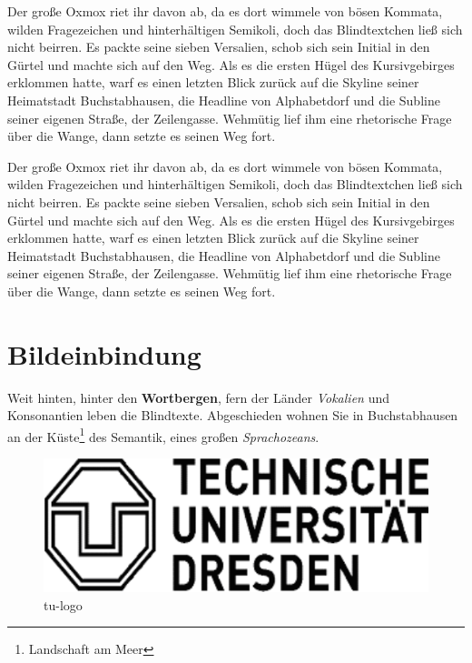 \documentclass[%
	12pt,%
	a4paper,%
	oneside,%
 liststotoc, idxtotoc, bibtotoc, %
	halfparskip,%
	nochapterprefix,%
	appendixprefix, %
smallheadings,%
]{scrreprt}
\newcommand{\alt}[1]{}%
\begin{document}
Der große Oxmox riet ihr davon ab, da es dort wimmele von bösen Kommata, wilden Fragezeichen und hinterhältigen Semikoli, doch das Blindtextchen ließ sich nicht beirren. Es packte seine sieben Versalien, schob sich sein Initial in den Gürtel und machte sich auf den Weg. Als es die ersten Hügel des Kursivgebirges erklommen hatte, warf es einen letzten Blick zurück auf die Skyline seiner Heimatstadt Buchstabhausen, die Headline von Alphabetdorf und die Subline seiner eigenen Straße, der Zeilengasse. Wehmütig lief ihm eine rhetorische Frage über die Wange, dann setzte es seinen Weg fort.

Der große Oxmox riet ihr davon ab, da es dort wimmele von bösen Kommata, wilden Fragezeichen und hinterhältigen Semikoli, doch das Blindtextchen ließ sich nicht beirren. Es packte seine sieben Versalien, schob sich sein Initial in den Gürtel und machte sich auf den Weg. Als es die ersten Hügel des Kursivgebirges erklommen hatte, warf es einen letzten Blick zurück auf die Skyline seiner Heimatstadt Buchstabhausen, die Headline von Alphabetdorf und die Subline seiner eigenen Straße, der Zeilengasse. Wehmütig lief ihm eine rhetorische Frage über die Wange, dann setzte es seinen Weg fort.


\chapter{Bildeinbindung}
\label{sec:Bilder}

Weit hinten, hinter den \textbf{Wortbergen}, fern der Länder \textit{Vokalien} und Konsonantien leben die Blindtexte. Abgeschieden wohnen Sie in Buchstabhausen an der Küste\footnote{Landschaft am Meer}
des Semantik, eines großen \textsl{Sprachozeans}. %

\begin{figure}[htbp] 
		\centering
		\alt{Ich bin das Logo der Technischen Universität Dresden}
		\includegraphics[scale=0.50]{images/tu_logo}%
	\caption{tu-logo}%
	\label{fig:tulogo}
\end{figure}
\end{document}

